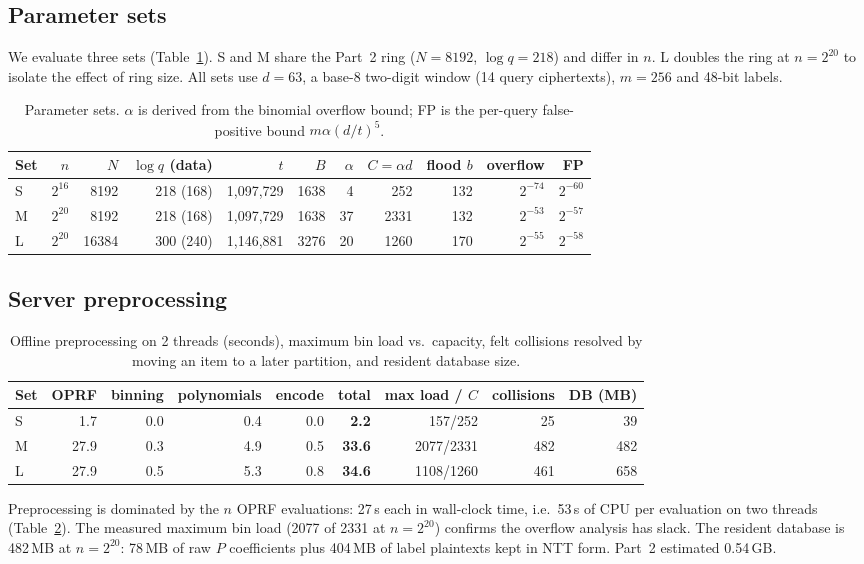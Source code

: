 \documentclass[11pt]{article}
\begin{document}
\subsection{Parameter sets}
We evaluate three sets (Table~\ref{tab:params}). S and M share the Part~2 ring ($N=8192$, $\log q=218$) and differ in $n$. L doubles the ring at $n=2^{20}$ to isolate the effect of ring size. All sets use $d=63$, a base-8 two-digit window (14 query ciphertexts), $m=256$ and 48-bit labels.
\begin{table}[H]
\centering\small
\caption{Parameter sets. $\alpha$ is derived from the binomial overflow bound; FP is the per-query false-positive bound $m\alpha(d/t)^5$.}
\label{tab:params}
\begin{tabular}{@{}lrrrrrrrrrr@{}}
\toprule
Set & $n$ & $N$ & $\log q$ (data) & $t$ & $B$ & $\alpha$ & $C=\alpha d$ & flood $b$ & overflow & FP \\
\midrule
S & $2^{16}$ & 8192 & 218 (168) & 1,097,729 & 1638 & 4 & 252 & 132 & $2^{-74}$ & $2^{-60}$ \\
M & $2^{20}$ & 8192 & 218 (168) & 1,097,729 & 1638 & 37 & 2331 & 132 & $2^{-53}$ & $2^{-57}$ \\
L & $2^{20}$ & 16384 & 300 (240) & 1,146,881 & 3276 & 20 & 1260 & 170 & $2^{-55}$ & $2^{-58}$ \\
\bottomrule
\end{tabular}
\end{table}

\subsection{Server preprocessing}
\begin{table}[H]
\centering\small
\caption{Offline preprocessing on 2 threads (seconds), maximum bin load vs.\ capacity, felt collisions resolved by moving an item to a later partition, and resident database size.}
\label{tab:pre}
\begin{tabular}{@{}lrrrrrrrr@{}}
\toprule
Set & OPRF & binning & polynomials & encode & total & max load / $C$ & collisions & DB (MB) \\
\midrule
S & 1.7 & 0.0 & 0.4 & 0.0 & \textbf{2.2} & 157/252 & 25 & 39 \\
M & 27.9 & 0.3 & 4.9 & 0.5 & \textbf{33.6} & 2077/2331 & 482 & 482 \\
L & 27.9 & 0.5 & 5.3 & 0.8 & \textbf{34.6} & 1108/1260 & 461 & 658 \\
\bottomrule
\end{tabular}
\end{table}
Preprocessing is dominated by the $n$ OPRF evaluations: 27\,\textmu s each in wall-clock time, i.e.\ 53\,\textmu s of CPU per evaluation on two threads (Table~\ref{tab:pre}). The measured maximum bin load (2077 of 2331 at $n=2^{20}$) confirms the overflow analysis has slack. The resident database is 482\,MB at $n=2^{20}$: 78\,MB of raw $P$ coefficients plus 404\,MB of label plaintexts kept in NTT form. Part~2 estimated 0.54\,GB.
\end{document}
